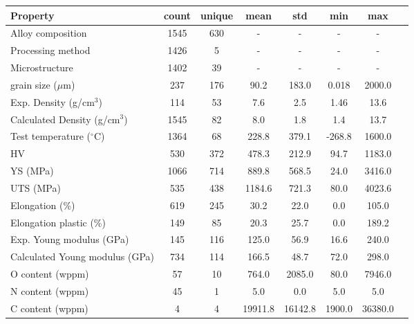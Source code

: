 \begin{tabular}{lccccccc}
\toprule
Property & count & unique & mean & std & min & max \\
\midrule
Alloy composition & 1545 & 630 & - & - & - & - \\
Processing method & 1426 & 5 & - & - & - & - \\
Microstructure & 1402 & 39 & - & - & - & - \\
grain size ($\mu$m) & 237 & 176 & 90.2 & 183.0 & 0.018 & 2000.0 \\
Exp. Density (g/cm$^3$) & 114 & 53 & 7.6 & 2.5 & 1.46 & 13.6 \\
Calculated Density (g/cm$^3$) & 1545 & 82 & 8.0 & 1.8 & 1.4 & 13.7 \\
Test temperature ($^\circ$C) & 1364 & 68 & 228.8 & 379.1 & -268.8 & 1600.0 \\
HV & 530 & 372 & 478.3 & 212.9 & 94.7 & 1183.0 \\
YS (MPa) & 1066 & 714 & 889.8 & 568.5 & 24.0 & 3416.0 \\
UTS (MPa) & 535 & 438 & 1184.6 & 721.3 & 80.0 & 4023.6 \\
Elongation (\%) & 619 & 245 & 30.2 & 22.0 & 0.0 & 105.0 \\
Elongation plastic (\%) & 149 & 85 & 20.3 & 25.7 & 0.0 & 189.2 \\
Exp. Young modulus (GPa) & 145 & 116 & 125.0 & 56.9 & 16.6 & 240.0 \\
Calculated Young modulus (GPa) & 734 & 114 & 166.5 & 48.7 & 72.0 & 298.0 \\
O content (wppm) & 57 & 10 & 764.0 & 2085.0 & 80.0 & 7946.0 \\
N content (wppm) & 45 & 1 & 5.0 & 0.0 & 5.0 & 5.0 \\
C content (wppm) & 4 & 4 & 19911.8 & 16142.8 & 1900.0 & 36380.0 \\
\bottomrule
\end{tabular}
